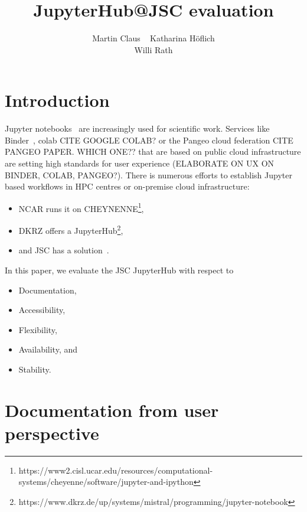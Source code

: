 \documentclass[11pt,a4paper]{article}
\title{\textbf{JupyterHub@JSC evaluation}}
\author{
  Martin Claus \ %
	Katharina Höflich \\
	Willi Rath}
\begin{document}
\maketitle


%


\section{Introduction}
\label{s-introductoin}

Jupyter notebooks~\citet{Kluyver2016} are increasingly used for scientific work.
Services like Binder~\citet{Jupyter2018}, colab CITE GOOGLE COLAB? or the Pangeo cloud federation CITE PANGEO PAPER. WHICH ONE?? that are based on public cloud infrastructure are setting high standards for user experience (ELABORATE ON UX ON BINDER, COLAB, PANGEO?).
There is numerous efforts to establish Jupyter based workflows in HPC centres or on-premise cloud infrastructure:
\begin{itemize}
  \item NCAR runs it on CHEYNENNE\footnote{https://www2.cisl.ucar.edu/resources/computational-systems/cheyenne/software/jupyter-and-ipython},
  \item DKRZ offers a JupyterHub\footnote{https://www.dkrz.de/up/systems/mistral/programming/jupyter-notebook},
  \item and JSC has a solution~\citet{Goebbert2018}.
\end{itemize}

In this paper, we evaluate the JSC JupyterHub with respect to
\begin{itemize}
  \item Documentation,
  \item Accessibility,
  \item Flexibility,
  \item Availability, and
  \item Stability.
\end{itemize}


\section{Documentation from user perspective}
\label{s-doc-from-user-pov}
\end{document}
